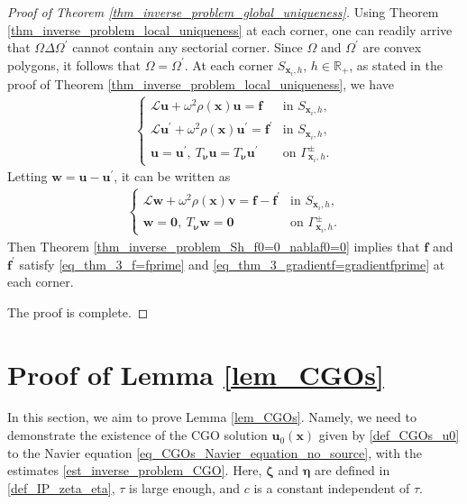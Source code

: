 \documentclass[11pt,reqno,oneside]{amsart}
\theoremstyle{definition}
\theoremstyle{remark}
\numberwithin{equation}{section}
\numberwithin{equation}{section}
\theoremstyle{remark}
\begin{document}
\begin{proof}[Proof of Theorem \ref{thm_inverse_problem_global_uniqueness}]
	
	Using Theorem \ref{thm_inverse_problem_local_uniqueness} at each corner, one can readily arrive that $ \Omega \Delta \Omega^{\prime} $ cannot contain any sectorial corner. Since $ \Omega $ and $ \Omega^{\prime} $ are convex polygons, it follows that $ \Omega = \Omega^{\prime} $. At each corner $ S_{\mathbf{x}_{i},h} $, $ h\in\mathbb{R}_+ $, as stated in the proof of Theorem \ref{thm_inverse_problem_local_uniqueness}, we have 
	\begin{align*} 
		\begin{cases}
			\mathcal{L} \mathbf{u} + \omega^2 \rho\left(\mathbf{x}\right) \mathbf{u} = \mathbf{f} & \text{in } S_{\mathbf{x}_{i},h} , \\
			\mathcal{L} \mathbf{u}^{\prime} + \omega^2 \rho\left(\mathbf{x}\right) \mathbf{u}^{\prime} = \mathbf{f}^{\prime} & \text{in } S_{\mathbf{x}_{i},h} , \\
			\mathbf{u} = \mathbf{u}^{\prime}, \ T_{\bm{\nu}} \mathbf{u}=T_{\bm{\nu}} \mathbf{u}^{\prime} & \text {on } \Gamma_{\mathbf{x}_{i},h}^{\pm} .
		\end{cases}
	\end{align*}
	Letting $ \mathbf{w} = \mathbf{u} - \mathbf{u}^{\prime} $, it can be written as
	\begin{align*} 
		\begin{cases}
			\mathcal{L} \mathbf{w} + \omega^2 \rho\left(\mathbf{x}\right) \mathbf{v} = \mathbf{f}-\mathbf{f}^{\prime} & \text{in } S_{\mathbf{x}_{i},h} , \\
			\mathbf{w} = \bm{0}, \ T_{\bm{\nu}} \mathbf{w} = \bm{0} & \text {on } \Gamma_{\mathbf{x}_{i},h}^{\pm} .
		\end{cases}
	\end{align*}
	Then Theorem \ref{thm_inverse_problem_Sh_f0=0_nablaf0=0} implies that $ \mathbf{f} $ and $ \mathbf{f}^{\prime} $ satisfy \eqref{eq_thm_3_f=fprime} and \eqref{eq_thm_3_gradientf=gradientfprime} at each corner.  
	
	The proof is complete.
\end{proof}

\appendix 
\section{Proof of Lemma \ref{lem_CGOs}} \label{section_appendix} 
In this section, we aim to prove Lemma \ref{lem_CGOs}. Namely,  we need to demonstrate  the existence of the CGO solution $ \mathbf{u}_0\left(\mathbf{x}\right)$ given by \eqref{def_CGOs_u0}  to the Navier equation \eqref{eq_CGOs_Navier_equation_no_source}, with the estimates \eqref{est_inverse_problem_CGO}. Here, $ \bm{\zeta} $ and $ \bm{\eta} $ are defined in \eqref{def_IP_zeta_eta}, $ \tau $ is large enough, and $ c $ is a constant independent of $ \tau $. 
\end{document}
